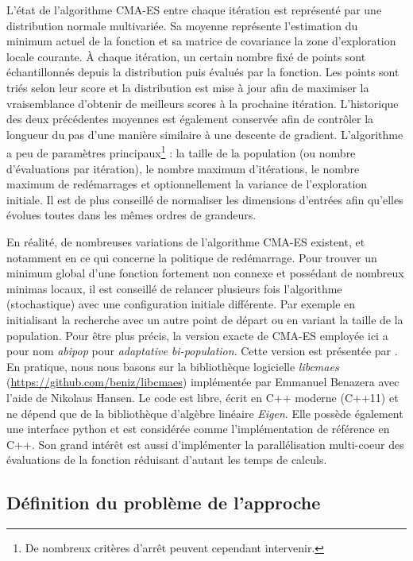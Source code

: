 L'état de l'algorithme CMA-ES entre chaque itération est représenté par
une distribution normale multivariée.
Sa moyenne représente l'estimation du minimum actuel de la fonction et
sa matrice de covariance la zone d'exploration locale courante.
À chaque itération, un certain nombre fixé de points sont échantillonnés
depuis la distribution puis évalués par la fonction.
Les points sont triés selon leur score et la distribution
est mise à jour afin de maximiser la vraisemblance d'obtenir
de meilleurs scores à la prochaine itération.
L'historique des deux précédentes moyennes est également 
conservée afin de contrôler la longueur du pas d'une manière similaire
à une descente de gradient.
L'algorithme a peu de paramètres principaux\footnote{De nombreux critères 
d'arrêt peuvent cependant intervenir.} : la taille de la population 
(ou nombre d'évaluations par itération), le nombre maximum d'itérations, 
le nombre maximum de redémarrages et optionnellement la variance de l'exploration initiale.
Il est de plus conseillé de normaliser les dimensions d'entrées afin qu'elles
évolues toutes dans les mêmes ordres de grandeurs.

En réalité, de nombreuses variations de l'algorithme CMA-ES existent, 
et notamment en ce qui concerne la politique de redémarrage.
Pour trouver un minimum global d'une fonction fortement non connexe et possédant
de nombreux minimas locaux, il est conseillé de relancer plusieurs fois
l'algorithme (stochastique) avec une configuration initiale différente.
Par exemple en initialisant la recherche avec un autre point de départ 
ou en variant la taille de la population.
Pour être plus précis, la version exacte de CMA-ES employée ici a pour
nom \og \textit{abipop} \fg pour \textit{adaptative bi-population}.
Cette version est présentée par \cite{hansen_benchmarking_2009}.\\

En pratique, nous nous basons sur la bibliothèque logicielle \textit{libcmaes}
(\url{https://github.com/beniz/libcmaes}) implémentée par Emmanuel Benazera 
avec l'aide de Nikolaus Hansen.
Le code est libre, écrit en C++ moderne (C++11) et ne dépend que de
la bibliothèque d'algèbre linéaire \textit{Eigen}.
Elle possède également une interface python et est considérée comme
l'implémentation de référence en C++.
Son grand intérêt est aussi d'implémenter la parallélisation multi-coeur
des évaluations de la fonction réduisant d'autant les temps de calculs.

\subsection{Définition du problème de l'approche}


